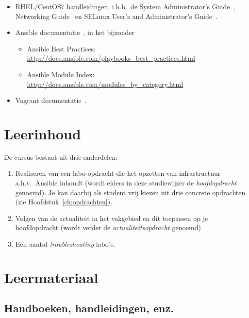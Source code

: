 \begin{itemize}
  \item RHEL/CentOS7 handleidingen, i.h.b.~de System Administrator's Guide~\autocite{SvistunovEtAl2016}, Networking Guide~\autocite{JahodaEtAl2016} en SELinux User's and Administrator's Guide~\autocite{JahodaEtAl2016a}.
  \item Ansible documentatie~\autocite{Ansible2016}, in het bijzonder
  
  \begin{itemize}
    \item Ansible Best Practices: \url{http://docs.ansible.com/playbooks_best_practices.html}
    \item Ansible Module Index: \url{http://docs.ansible.com/modules_by_category.html}
  \end{itemize}
  \item Vagrant documentatie~\autocite{Hashicorp}.
\end{itemize}

\section{Leerinhoud}
\label{sec:leerinhoud}

De cursus bestaat uit drie onderdelen:

\begin{enumerate}
  \item Realiseren van een labo-opdracht die het opzetten van infrastructuur a.h.v.~Ansible inhoudt (wordt elders in deze studiewijzer de \emph{hoofdopdracht} genoemd). Je kan daarbij als student vrij kiezen uit drie concrete opdrachten (zie Hoofdstuk~\ref{ch:opdrachten}).
  \item Volgen van de actualiteit in het vakgebied en dit toepassen op je hoofdopdracht (wordt verder de \emph{actualiteitsopdracht} genoemd)
  \item Een aantal \emph{troubleshooting}-labo's.
\end{enumerate}

\section{Leermateriaal}
\label{sec:leermateriaal}

\subsection{Handboeken, handleidingen, enz.}
\label{ssec:handboeken}

